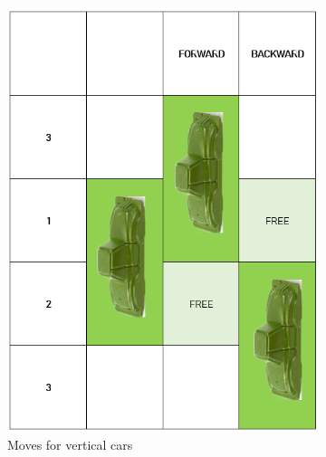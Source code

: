 \documentclass{article}
\begin{document}
\begin{figure}[H]
    \centering
    \begin{subfigure}{.5\textwidth}
      \centering
      \includegraphics[width=\linewidth]{images/ver_car.png}
      \caption{Moves for vertical cars}
    \end{subfigure}%
    \begin{subfigure}{.5\textwidth}
      \centering

\end{subfigure}
\end{figure}
\end{document}
